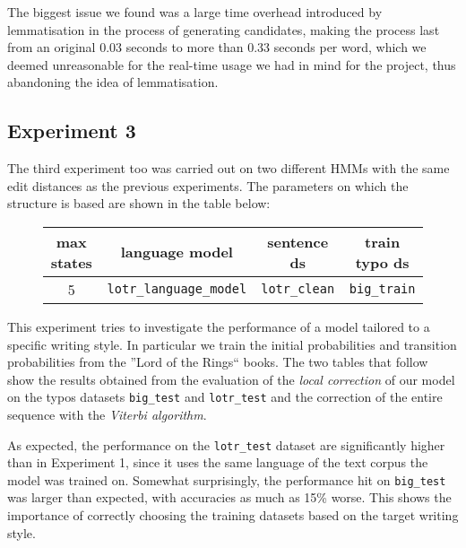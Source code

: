 The biggest issue we found was a large time overhead introduced by lemmatisation in the process of generating 
candidates, making the process last from an original \num{0,03} seconds to more than \num{0,33} seconds per word, which 
we deemed unreasonable for the real-time usage we had in mind for the project, thus abandoning the idea of 
lemmatisation.

\subsection{Experiment 3}

The third experiment too was carried out on two different HMMs with the same edit distances as the previous 
experiments. 
The parameters on which the structure is based are shown in the table below:

\begin{figure}[H]
	\centering
	\begin{tabular}{cccc}
		\toprule
		max states 	& language model	&  sentence ds  &  train typo ds \\ \midrule
		\num{5} & \texttt{lotr\_language\_model} & \texttt{lotr\_clean}  & \texttt{big\_train} \\
		\bottomrule
	\end{tabular}
	\label{tab:error_model3}
\end{figure}

This experiment tries to investigate the performance of a model tailored to a specific writing style. In particular 
we train the initial probabilities and transition probabilities from the ”Lord of the Rings“ books. The two tables that 
follow show the results obtained from the evaluation of the \textit{local correction} of our model on the typos 
datasets \texttt{big\_test} and \texttt{lotr\_test} and the correction of the entire sequence with the \textit{Viterbi 
algorithm}.

As expected, the performance on the \texttt{lotr\_test} dataset are significantly higher than in Experiment 1, since it 
uses the same language of the text corpus the model was trained on. Somewhat surprisingly, the performance hit on 
\texttt{big\_test} was larger than expected, with accuracies as much as 15\% worse. This shows the importance of 
correctly choosing the training datasets based on the target writing style.

